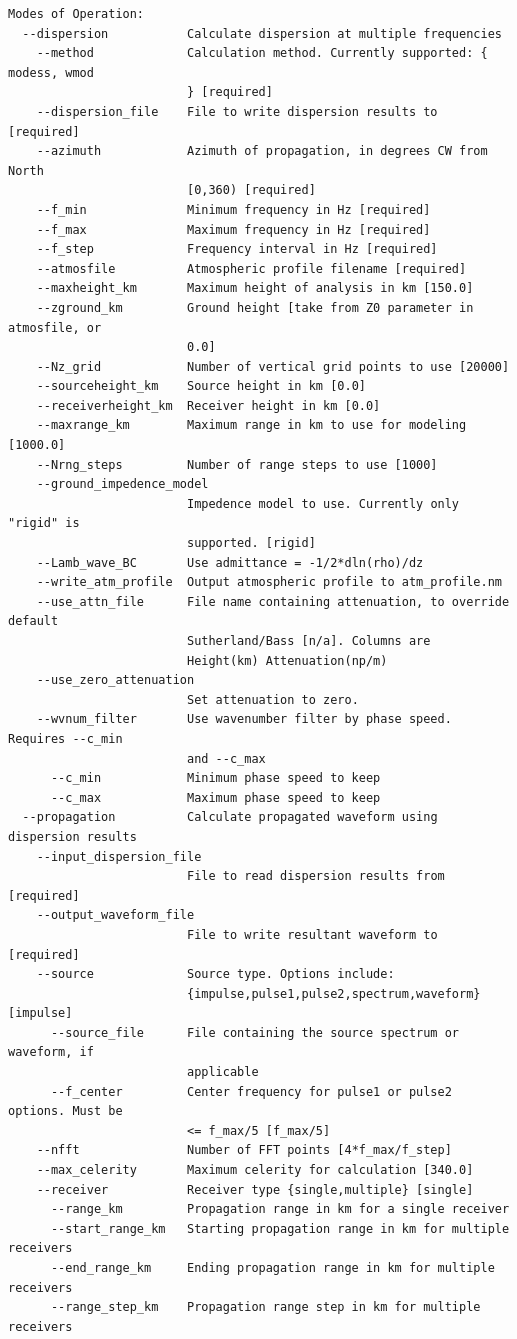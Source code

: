 \begin{verbatim}
Modes of Operation:
  --dispersion           Calculate dispersion at multiple frequencies
    --method             Calculation method. Currently supported: { modess, wmod
                         } [required]
    --dispersion_file    File to write dispersion results to [required]
    --azimuth            Azimuth of propagation, in degrees CW from North
                         [0,360) [required]
    --f_min              Minimum frequency in Hz [required]
    --f_max              Maximum frequency in Hz [required]
    --f_step             Frequency interval in Hz [required]
    --atmosfile          Atmospheric profile filename [required]
    --maxheight_km       Maximum height of analysis in km [150.0]
    --zground_km         Ground height [take from Z0 parameter in atmosfile, or
                         0.0]
    --Nz_grid            Number of vertical grid points to use [20000]
    --sourceheight_km    Source height in km [0.0]
    --receiverheight_km  Receiver height in km [0.0]
    --maxrange_km        Maximum range in km to use for modeling [1000.0]
    --Nrng_steps         Number of range steps to use [1000]
    --ground_impedence_model
                         Impedence model to use. Currently only "rigid" is
                         supported. [rigid]
    --Lamb_wave_BC       Use admittance = -1/2*dln(rho)/dz
    --write_atm_profile  Output atmospheric profile to atm_profile.nm
    --use_attn_file      File name containing attenuation, to override default
                         Sutherland/Bass [n/a]. Columns are
                         Height(km) Attenuation(np/m)
    --use_zero_attenuation
                         Set attenuation to zero.
    --wvnum_filter       Use wavenumber filter by phase speed. Requires --c_min
                         and --c_max
      --c_min            Minimum phase speed to keep
      --c_max            Maximum phase speed to keep
  --propagation          Calculate propagated waveform using dispersion results
    --input_dispersion_file
                         File to read dispersion results from [required]
    --output_waveform_file
                         File to write resultant waveform to [required]
    --source             Source type. Options include:
                         {impulse,pulse1,pulse2,spectrum,waveform} [impulse]
      --source_file      File containing the source spectrum or waveform, if
                         applicable
      --f_center         Center frequency for pulse1 or pulse2 options. Must be
                         <= f_max/5 [f_max/5]
    --nfft               Number of FFT points [4*f_max/f_step]
    --max_celerity       Maximum celerity for calculation [340.0]
    --receiver           Receiver type {single,multiple} [single]
      --range_km         Propagation range in km for a single receiver
      --start_range_km   Starting propagation range in km for multiple receivers
      --end_range_km     Ending propagation range in km for multiple receivers
      --range_step_km    Propagation range step in km for multiple receivers




\end{verbatim}
